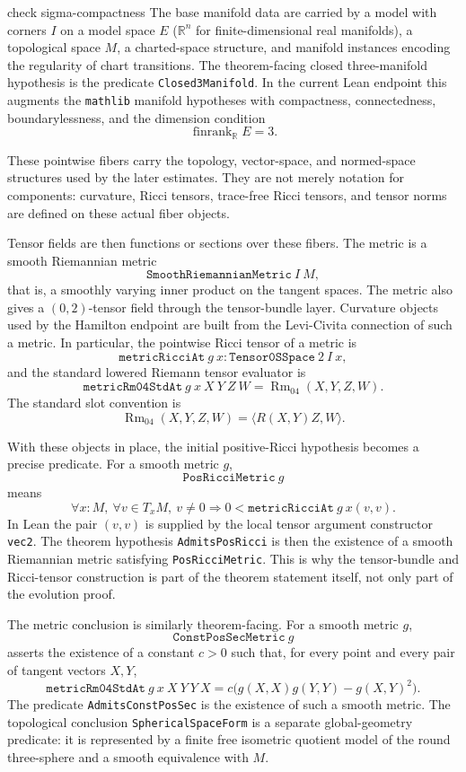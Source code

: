 \documentclass[11pt]{article}
\theoremstyle{plain}
\theoremstyle{definition}
\theoremstyle{remark}
\newcommand{\Rm}{\operatorname{Rm}}
\newcommand{\leanref}[1]{\nolinkurl{#1}}
\begin{document}
{\color{red} check sigma-compactness}
The base manifold data are carried by a model with corners \(I\) on a model
space \(E\) ($\mathbb{R}^n$ for finite-dimensional real manifolds), a
topological space \(M\), a charted-space structure, and manifold instances
encoding the regularity of chart transitions.  The theorem-facing closed
three-manifold hypothesis is the
predicate \leanref{Closed3Manifold}.
In the current Lean endpoint this augments the \texttt{mathlib} manifold
hypotheses with compactness, connectedness, boundarylessness, and the dimension
condition
\[
  \operatorname{finrank}_{\mathbb R} E = 3 .
\]


These pointwise fibers carry the topology, vector-space, and normed-space
structures used by the later estimates.  They are not merely notation for
components: curvature, Ricci tensors, trace-free Ricci tensors, and tensor
norms are defined on these actual fiber objects.

Tensor fields are then functions or sections over these fibers.  The metric is
a smooth Riemannian metric
\[
  \mathtt{SmoothRiemannianMetric}\ I\ M,
\]
that is, a smoothly varying inner product on the tangent spaces.  The metric
also gives a \((0,2)\)-tensor field through the tensor-bundle layer.  Curvature
objects used by the Hamilton endpoint are built from the Levi-Civita connection
of such a metric.  In particular, the pointwise Ricci tensor of a metric is
\[
  \mathtt{metricRicciAt}\ g\ x
  :
  \mathtt{Tensor0SSpace}\ 2\ I\ x,
\]
and the standard lowered Riemann tensor evaluator is
\[
  \mathtt{metricRm04StdAt}\ g\ x\ X\ Y\ Z\ W
  =
  \Rm_{04}(X,Y,Z,W).
\]
The standard slot convention is
\[
  \Rm_{04}(X,Y,Z,W)=\langle R(X,Y)Z,W\rangle .
\]

With these objects in place, the initial positive-Ricci hypothesis becomes a
precise predicate.  For a smooth metric \(g\),
\[
  \mathtt{PosRicciMetric}\ g
\]
means
\[
  \forall x:M,\ \forall v\in T_xM,\ v\ne0
  \Longrightarrow
  0 <
  \mathtt{metricRicciAt}\ g\ x(v,v).
\]
In Lean the pair \((v,v)\) is supplied by the local tensor argument constructor
\leanref{vec2}.  The theorem hypothesis
\leanref{AdmitsPosRicci} is then the existence of a smooth Riemannian metric satisfying
\leanref{PosRicciMetric}.  This is why the tensor-bundle and Ricci-tensor
construction is part of the theorem statement itself, not only part of the
evolution proof.

The metric conclusion is similarly theorem-facing.  For a smooth metric \(g\),
\[
  \mathtt{ConstPosSecMetric}\ g
\]
asserts the existence of a constant \(c>0\) such that, for every point and every
pair of tangent vectors \(X,Y\),
\[
  \mathtt{metricRm04StdAt}\ g\ x\ X\ Y\ Y\ X
  =
  c\bigl(
      g(X,X)g(Y,Y)-g(X,Y)^2
    \bigr).
\]
The predicate \leanref{AdmitsConstPosSec} is the existence of such a smooth
metric.  The topological conclusion \leanref{SphericalSpaceForm} is a separate
global-geometry predicate: it is represented by a finite free isometric
quotient model of the round three-sphere and a smooth equivalence with \(M\).
\end{document}
